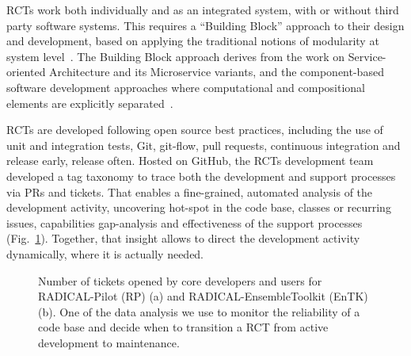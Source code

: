 \documentclass[preprint,12pt, a4paper]{elsarticle}
\begin{document}
RCTs work both individually and as an integrated system, with or without third party software systems. This requires a ``Building Block'' approach to their design and development, based on applying the traditional notions of modularity at system level~\cite{turilli2019middleware}. The Building Block approach derives from the work on Service-oriented Architecture and its Microservice variants, and the component-based software development approaches where computational and compositional elements are explicitly separated~\cite{garlan1995architectural,clemens1998component,schneider2000components}.

RCTs are developed following open source best practices, including the use of unit and integration tests, Git, git-flow, pull requests, continuous integration and release early, release often. Hosted on GitHub, the RCTs development team developed a tag taxonomy to trace both the development and support processes via PRs and tickets. That enables a fine-grained, automated analysis of the development activity, uncovering hot-spot in the code base, classes or recurring issues, capabilities gap-analysis and effectiveness of the support processes (Fig.~\ref{fig:tags}). Together, that insight allows to direct the development activity dynamically, where it is actually needed.

\begin{figure}
        \centering
        \qquad
        \caption{Number of tickets opened by core developers and users for RADICAL-Pilot (RP) (a) and RADICAL-EnsembleToolkit (EnTK) (b). One of the data analysis we use to monitor the reliability of a code base and decide when to transition a RCT from active development to maintenance.}\label{fig:tags}
\end{figure}
\end{document}
